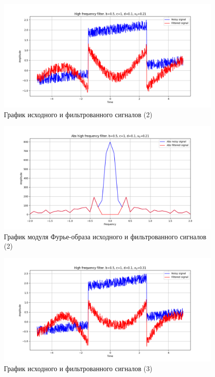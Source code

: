 \documentclass[a4paper, 12pt]{article}
\begin{document}
    \begin{figure}[!htb]
        \centering
        \includegraphics[scale=0.48]{2_u_flt_u_nolow.png}
        \captionsetup{skip=0pt}
        \caption{График исходного и фильтрованного сигналов (2)}
        \label{fig:fig29}
    \end{figure}
    \begin{figure}[H]
        \centering
        \includegraphics[scale=0.48]{2_abs_u_U_nolow.png}
        \captionsetup{skip=0pt}
        \caption{График модуля Фурье-образа исходного и фильтрованного сигналов (2)}
        \label{fig:fig30}
    \end{figure}
    \begin{figure}[!htb]
        \centering
        \includegraphics[scale=0.48]{3_u_flt_u_nolow.png}
        \captionsetup{skip=0pt}
        \caption{График исходного и фильтрованного сигналов (3)}
        \label{fig:fig31}
    \end{figure}
\end{document}
